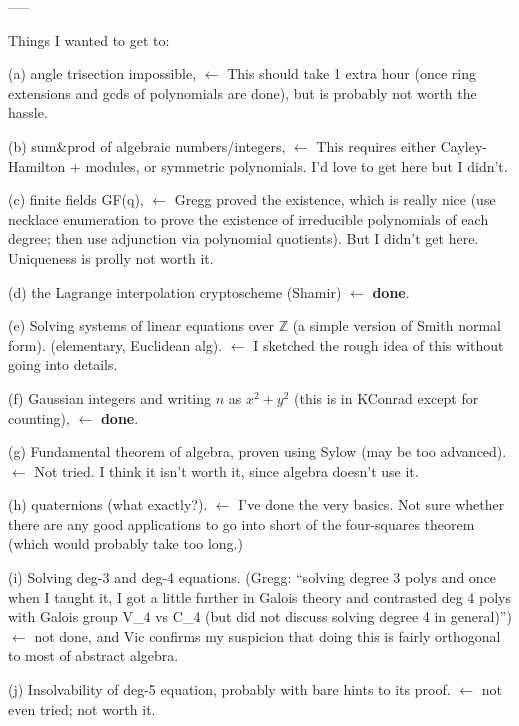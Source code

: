 \documentclass[numbers=enddot,12pt,final,onecolumn,notitlepage]{scrartcl}%
\theoremstyle{definition}
\newenvironment{noncompile}{}{}
\begin{document}
\begin{noncompile}
-----

Things I wanted to get to:

(a) angle trisection impossible, $\leftarrow$ This should take 1 extra hour
(once ring extensions and gcds of polynomials are done), but is probably not
worth the hassle.

(b) sum\&prod of algebraic numbers/integers, $\leftarrow$ This requires either
Cayley-Hamilton + modules, or symmetric polynomials. I'd love to get here but
I didn't.

(c) finite fields GF(q), $\leftarrow$ Gregg proved the existence, which is
really nice (use necklace enumeration to prove the existence of irreducible
polynomials of each degree; then use adjunction via polynomial quotients). But
I didn't get here. Uniqueness is prolly not worth it.

(d) the Lagrange interpolation cryptoscheme (Shamir) $\leftarrow$
\textbf{done}.

(e) Solving systems of linear equations over $\mathbb{Z}$ (a simple version of
Smith normal form). (elementary, Euclidean alg). $\leftarrow$ I sketched the
rough idea of this without going into details.

(f) Gaussian integers and writing $n$ as $x^{2}+y^{2}$ (this is in KConrad
except for counting), $\leftarrow$ \textbf{done}.

(g) Fundamental theorem of algebra, proven using Sylow (may be too advanced).
$\leftarrow$ Not tried. I think it isn't worth it, since algebra doesn't use it.

(h) quaternions (what exactly?). $\leftarrow$ I've done the very basics. Not
sure whether there are any good applications to go into short of the
four-squares theorem (which would probably take too long.)

(i) Solving deg-3 and deg-4 equations. (Gregg: \textquotedblleft solving
degree 3 polys and once when I taught it, I got a little further in Galois
theory and contrasted deg 4 polys with Galois group V\_4 vs C\_4 (but did not
discuss solving degree 4 in general)\textquotedblright) $\leftarrow$ not done,
and Vic confirms my suspicion that doing this is fairly orthogonal to most of
abstract algebra.

(j) Insolvability of deg-5 equation, probably with bare hints to its proof.
$\leftarrow$ not even tried; not worth it.
\end{noncompile}
\end{document}
